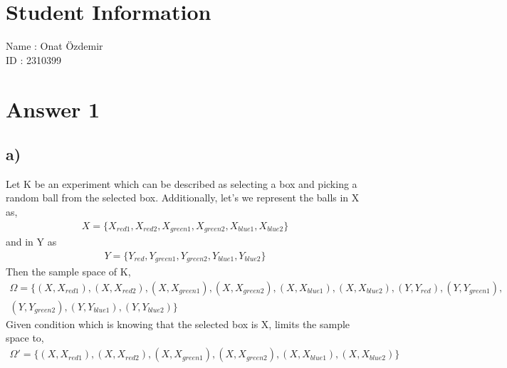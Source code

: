 \documentclass[12pt]{article}
\begin{document}
\section*{Student Information}

Name : Onat Özdemir\\

ID : 2310399 \\


\section*{Answer 1}
\subsection*{a)} Let K be an experiment which can be described as selecting a box and picking a random ball from the selected box. Additionally, let's we represent the balls in X as, 
\begin{equation*} 
\begin{split}
X = \{X_{red1},X_{red2},X_{green1},X_{green2},X_{blue1},X_{blue2}\}
\end{split}
\end{equation*}
and in Y as \\
\begin{equation*} 
\begin{split}
Y = \{Y_{red},Y_{green1},Y_{green2},Y_{blue1},Y_{blue2}\}
\end{split}
\end{equation*}
Then the sample space of K,
\begin{equation*} 
\begin{split}
\Omega = \{(X,X_{red1}),(X,X_{red2}),(X,X_{green1}),(X,X_{green2}),(X,X_{blue1}),(X,X_{blue2}),(Y,Y_{red}),(Y,Y_{green1}),\\ (Y,Y_{green2}),(Y,Y_{blue1}),(Y,Y_{blue2})\}
\end{split}
\end{equation*}
Given condition which is knowing that the selected box is X, limits the sample space to,
\begin{equation*} 
\begin{split}
\Omega' = \{(X,X_{red1}),(X,X_{red2}),(X,X_{green1}),(X,X_{green2}),(X,X_{blue1}),(X,X_{blue2})\}
\end{split}
\end{equation*}
\end{document}
